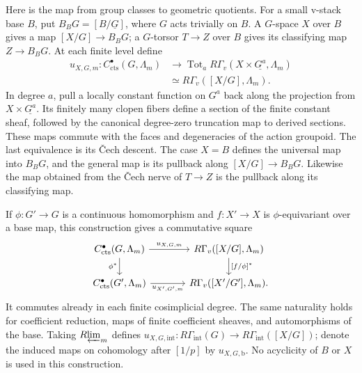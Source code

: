 \documentclass[11pt]{article}
\numberwithin{equation}{section}
\theoremstyle{definition}
\theoremstyle{remark}
\newcommand{\cts}{\mathrm{cts}}
\newcommand{\Rlim}{R\!\varprojlim}
\begin{document}
Here is the map from group classes to geometric quotients.  For a small
v-stack base $B$, put $B_BG=[B/\underline G]$, where $G$ acts trivially
on $B$.  A $G$-space $X$ over $B$ gives a map $[X/G]\to B_BG$; a
$G$-torsor $T\to Z$ over $B$ gives its classifying map $Z\to B_BG$.
At each finite level define
\begin{equation}\label{eq:finite-constant-cochains}
\begin{split}
 u_{X,G,m}:C_{\cts}^{\bullet}(G,\Lambda_m)
 &\longrightarrow
   \operatorname{Tot}_{a}R\Gamma_v
       (X\times\underline{G^a},\Lambda_m)\\
 &\simeq R\Gamma_v([X/G],\Lambda_m).
\end{split}
\end{equation}
In degree $a$, pull a locally constant function on $G^a$ back along
the projection from $X\times\underline{G^a}$.  Its finitely many
clopen fibers define a section of the finite constant sheaf, followed
by the canonical degree-zero truncation map to derived sections.
These maps commute with
the faces and degeneracies of the action groupoid.  The last
equivalence is its \v{C}ech descent.  The case $X=B$ defines the
universal map into $B_BG$, and the general map is its pullback along
$[X/G]\to B_BG$.  Likewise the map obtained from the \v{C}ech nerve
of $T\to Z$ is the pullback along its classifying map.

If $\phi:G'\to G$ is a continuous homomorphism and $f:X'\to X$ is
$\phi$-equivariant over a base map, this construction gives a
commutative square
\begin{equation}\label{eq:constant-cochain-naturality}
\begin{tikzcd}[column sep=large]
 C_{\cts}^{\bullet}(G,\Lambda_m)
     \arrow[r,"u_{X,G,m}"] \arrow[d,"\phi^*"']
   &R\Gamma_v([X/G],\Lambda_m)\arrow[d,"{[f/\phi]^*}"]\\
 C_{\cts}^{\bullet}(G',\Lambda_m)
     \arrow[r,"u_{X',G',m}"']
   &R\Gamma_v([X'/G'],\Lambda_m).
\end{tikzcd}
\end{equation}
It commutes already in each finite cosimplicial degree.  The same
naturality holds for coefficient reduction, maps of finite coefficient
sheaves, and automorphisms of the base.  Taking $\Rlim_m$ defines
$u_{X,G,\mathrm{int}}:R\Gamma_{\mathrm{int}}(G)\to
R\Gamma_{\mathrm{int}}([X/G])$; denote the induced maps on cohomology
after $[1/p]$ by $u_{X,G,\mathrm b}$.  No acyclicity of $B$ or $X$
is used in this construction.
\end{document}

